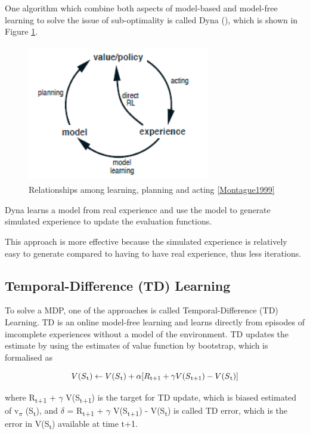 \documentclass[12pt,twoside]{report}
\begin{document}
One algorithm which combine both aspects of model-based and model-free learning to solve the issue of sub-optimality is called Dyna (\cite{Sutton1990}), which is shown in Figure \ref{dyna}.

\begin{figure}[!htb]
\centering
\includegraphics[width=8cm, height=6cm]{./figures/dyna}
\caption{Relationships among learning, planning and acting \ref{Montague1999}}
\label{dyna}
\end{figure}

Dyna learns a model from real experience and use the model to generate simulated experience to update the evaluation functions.

This approach is more effective because the simulated experience is relatively easy to generate compared to having to have real experience, thus less iterations.

\subsection{Temporal-Difference (TD) Learning}

To solve a MDP, one of the approaches is called Temporal-Difference (TD) Learning.
TD is an online model-free learning and learns directly from episodes of imcomplete experiences without a model of the environment.
TD updates the estimate by using the estimates of value function by bootstrap, which is formalised as 

\begin{equation}
\centering
V(S\textsubscript{t}) \leftarrow V(S\textsubscript{t}) + \alpha[R\textsubscript{t+1} + \gamma V(S\textsubscript{t+1}) - V(S\textsubscript{t})]
\end{equation}

where R\textsubscript{t+1} + $\gamma$ V(S\textsubscript{t+1}) is the target for TD update, which is biased estimated of v\textsubscript{$\pi$} (S\textsubscript{t}), and $\delta$ = R\textsubscript{t+1} + $\gamma$ V(S\textsubscript{t+1}) - V(S\textsubscript{t}) is called TD error, which is the error in V(S\textsubscript{t}) available at time t+1. 
\end{document}
